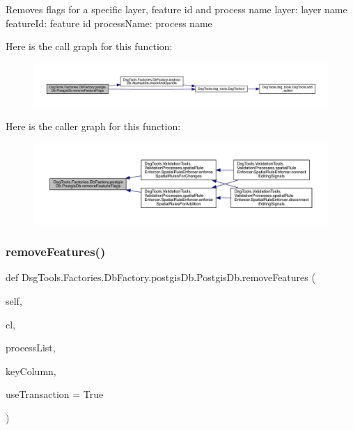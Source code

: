 \begin{DoxyVerb}Removes flags for a specific layer, feature id and process name
layer: layer name
featureId: feature id
processName: process name
\end{DoxyVerb}
 Here is the call graph for this function\+:
\nopagebreak
\begin{figure}[H]
\begin{center}
\leavevmode
\includegraphics[width=350pt]{class_dsg_tools_1_1_factories_1_1_db_factory_1_1postgis_db_1_1_postgis_db_ad204ec1c3548517d893e6b3f5af9594f_cgraph}
\end{center}
\end{figure}
Here is the caller graph for this function\+:
\nopagebreak
\begin{figure}[H]
\begin{center}
\leavevmode
\includegraphics[width=350pt]{class_dsg_tools_1_1_factories_1_1_db_factory_1_1postgis_db_1_1_postgis_db_ad204ec1c3548517d893e6b3f5af9594f_icgraph}
\end{center}
\end{figure}
\mbox{\label{class_dsg_tools_1_1_factories_1_1_db_factory_1_1postgis_db_1_1_postgis_db_a5f3497322b0b3db4c7a2aa925ba07f3a}} 
\subsubsection{\texorpdfstring{remove\+Features()}{removeFeatures()}}
{\footnotesize\ttfamily def Dsg\+Tools.\+Factories.\+Db\+Factory.\+postgis\+Db.\+Postgis\+Db.\+remove\+Features (\begin{DoxyParamCaption}\item[{}]{self,  }\item[{}]{cl,  }\item[{}]{process\+List,  }\item[{}]{key\+Column,  }\item[{}]{use\+Transaction = {\ttfamily True} }\end{DoxyParamCaption})}

